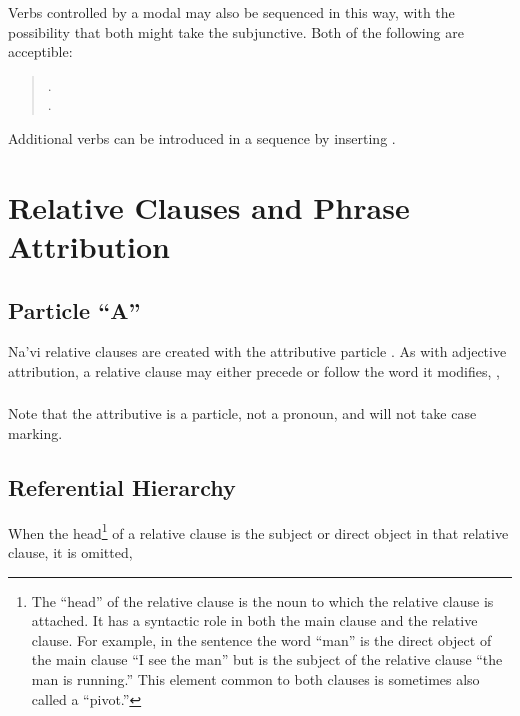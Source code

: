 Verbs controlled by a modal may also be sequenced in this way, with
the possibility that both might take the subjunctive.  Both of the
following are acceptible:

\begin{quotation}
\noindent{} . \\
\noindent{} .
\end{quotation}

\noindent Additional verbs can be introduced in a sequence by
inserting . 


\section{Relative Clauses and Phrase Attribution}
\subsection{Particle ``A''} Na'vi relative clauses are created with
the attributive particle .\label{syn:a} As
with adjective attribution, a relative clause may either precede or
follow the word it modifies,  ,
 

\subsubsection{} Note that the attributive  is a particle, not a
pronoun, and will not take case marking.

\subsection{Referential Hierarchy} When the head\footnote{The ``head''
of the relative clause is the noun to which the relative clause is
attached.  It has a syntactic role in both the main clause and the
relative clause.  For example, in the sentence  the word ``man'' is the direct object of the main clause ``I
see the man'' but is the subject of the relative clause ``the man is
running.''  This element common to both clauses is sometimes also
called a ``pivot.''} of a relative clause is the subject or direct
object in that relative clause, it is omitted,

